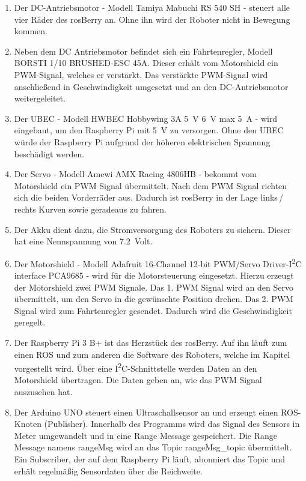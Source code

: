 \documentclass[conference]{IEEEtran}
\begin{document}
	\begin{enumerate}
		\item Der DC-Antriebsmotor - Modell Tamiya Mabuchi RS 540 SH - steuert alle vier Räder des rosBerry an.
		Ohne ihn wird der Roboter nicht in Bewegung kommen.
		\item Neben dem DC Antriebsmotor befindet sich ein Fahrtenregler, Modell BORSTI 1/10 BRUSHED-ESC 45A.
		Dieser erhält vom Motorshield ein PWM-Signal, welches er verstärkt.
		Das verstärkte PWM-Signal wird anschließend in Geschwindigkeit umgesetzt und an den DC-Antriebsmotor weitergeleitet.
		\item Der UBEC - Modell HWBEC Hobbywing 3A \SI{5}{V} \SI{6}{V} max \SI{5}{A} - wird eingebaut, um den Raspberry Pi mit \SI{5}{V} zu versorgen.
		Ohne den UBEC würde der Raspberry Pi aufgrund der höheren elektrischen Spannung beschädigt werden.
		\item Der Servo - Modell Amewi AMX Racing 4806HB - bekommt vom Motorshield ein PWM Signal übermittelt.
		Nach dem PWM Signal richten sich die beiden Vorderräder aus.
		Dadurch ist rosBerry in der Lage links\,/\,rechts Kurven sowie geradeaus zu fahren.
		\item Der Akku dient dazu, die Stromversorgung des Roboters zu sichern.
		Dieser hat eine Nennspannung von \SI{7,2}{Volt}. 
		\item Der Motorshield - Modell Adafruit 16-Channel 12-bit PWM/Servo 
		Driver-I\textsuperscript{2}C interface PCA9685 - wird für die 
		Motorsteuerung eingesetzt.
		Hierzu erzeugt der Motorshield zwei PWM Signale.
		Das 1. PWM Signal wird an den Servo übermittelt, um den Servo in die 
		gewünschte Position drehen.
		Das 2. PWM Signal wird zum Fahrtenregler gesendet.
		Dadurch wird die Geschwindigkeit geregelt.
		\item Der Raspberry Pi 3 B+ ist das Herzstück des rosBerry.
		Auf ihn läuft zum einen ROS und zum anderen die Software des Roboters, welche im Kapitel  vorgestellt wird.
		Über eine I\textsuperscript{2}C-Schnittstelle werden Daten an den 
		Motorshield übertragen.
		Die Daten geben an, wie das PWM Signal auszusehen hat.
		\item Der Arduino UNO steuert einen Ultraschallsensor an und erzeugt 
		einen ROS-Knoten (Publisher).
		Innerhalb des Programms wird das Signal des Sensors in Meter umgewandelt und in eine Range Message gespeichert.
		Die Range Message namens rangeMsg wird an das Topic rangeMsg\_topic übermittelt.
		Ein Subscriber, der auf dem Raspberry Pi läuft, abonniert das Topic und erhält regelmäßig Sensordaten über die Reichweite.
		

\end{enumerate}
\end{document}
